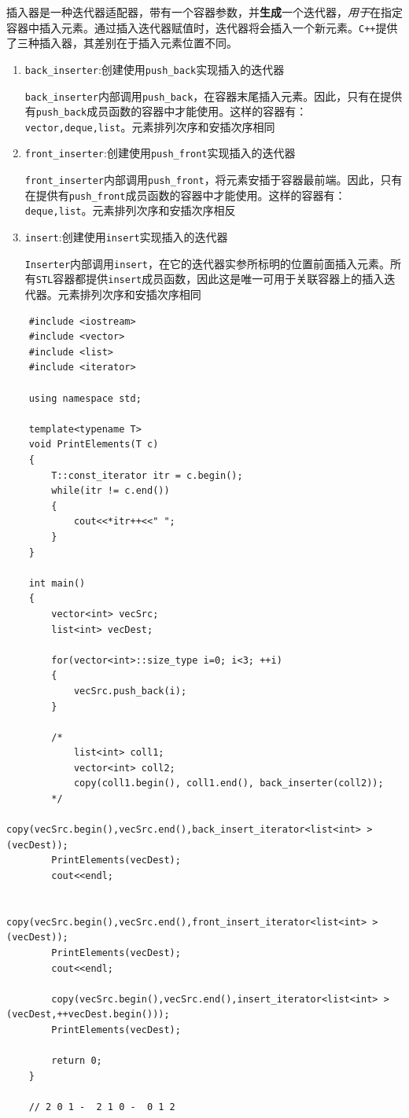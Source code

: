 \documentclass[UTF8,a4paper,12pt]{ctexbook}
\begin{document}
		插入器是一种迭代器适配器，带有一个容器参数，并\textbf{生成}一个迭代器，\textit{用于}在指定容器中插入元素。通过插入迭代器赋值时，迭代器将会插入一个新元素。\verb|C++|提供了三种插入器，其差别在于插入元素位置不同。
		\begin{enumerate}
			\item \verb|back_inserter|:创建使用\verb|push_back|实现插入的迭代器
			
			\verb|back_inserter|内部调用\verb|push_back|，在容器末尾插入元素。因此，只有在提供有\verb|push_back|成员函数的容器中才能使用。这样的容器有：\verb|vector,deque,list|。元素排列次序和安插次序相同
			\item \verb|front_inserter|:创建使用\verb|push_front|实现插入的迭代器
			
			\verb|front_inserter|内部调用\verb|push_front|，将元素安插于容器最前端。因此，只有在提供有\verb|push_front|成员函数的容器中才能使用。这样的容器有：\verb|deque,list|。元素排列次序和安插次序相反
			\item \verb|insert|:创建使用\verb|insert|实现插入的迭代器
			
			\verb|Inserter|内部调用\verb|insert|，在它的迭代器实参所标明的位置前面插入元素。所有\verb|STL|容器都提供\verb|insert|成员函数，因此这是唯一可用于关联容器上的插入迭代器。元素排列次序和安插次序相同
		\end{enumerate}
		
		\begin{lstlisting}
	#include <iostream>  
	#include <vector>  
	#include <list>  
	#include <iterator>  
	
	using namespace std;  
	
	template<typename T>  
	void PrintElements(T c)  
	{  
		T::const_iterator itr = c.begin();  
		while(itr != c.end())  
		{  
			cout<<*itr++<<" ";  
		}  
	}  
	
	int main()  
	{  
		vector<int> vecSrc;  
		list<int> vecDest;  
		
		for(vector<int>::size_type i=0; i<3; ++i)  
		{  
			vecSrc.push_back(i);  
		} 
		
		/*
			list<int> coll1; 
			vector<int> coll2;
			copy(coll1.begin(), coll1.end(), back_inserter(coll2));
		*/
		copy(vecSrc.begin(),vecSrc.end(),back_insert_iterator<list<int> >(vecDest));  
		PrintElements(vecDest);  
		cout<<endl;  
		
		copy(vecSrc.begin(),vecSrc.end(),front_insert_iterator<list<int> >(vecDest));  
		PrintElements(vecDest);  
		cout<<endl;  
		
		copy(vecSrc.begin(),vecSrc.end(),insert_iterator<list<int> >(vecDest,++vecDest.begin()));  
		PrintElements(vecDest);  
		
		return 0;  
	}  
	
	// 2 0 1 -  2 1 0 -  0 1 2
		\end{lstlisting}
	
\end{document}
